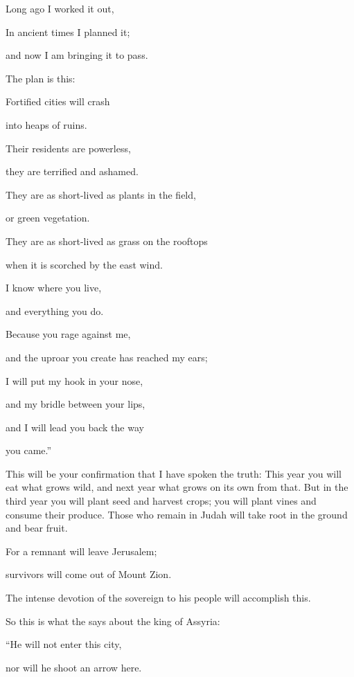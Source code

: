 {\par }{\Q Long
ago
I worked
it out,
\par }{\Q In ancient
times I planned
it;
\par }{\Q and now
I am bringing
it to pass.
\par }{\Q The plan is this:
\par }{\Q Fortified
cities
will crash
\par }{\Q into heaps
of ruins.
\par }{\Q {}Their residents
are powerless,
\par }{\Q they are terrified
and ashamed.
\par }{\Q They are as short-lived as plants
in the field,
\par }{\Q or green
vegetation.
\par }{\Q They are as short-lived as grass
on the rooftops
\par }{\Q when it is scorched
by
the east wind.
\par }{\Q {}I know
where you live,
\par }{\Q and everything you do.
\par }{\Q {}Because
you rage
against me,
\par }{\Q and the uproar
you create
has reached my ears;
\par }{\Q I
will put
my hook
in your nose,
\par }{\Q and my bridle
between your lips,
\par }{\Q and I will lead you back
the way
\par }{\Q you came.”
\par }{\PP This
will be your confirmation
that I have spoken the truth: This year
you will eat
what grows wild,
and next
year
what grows on its own
from that. But in the third
year
you will plant seed
and harvest
crops; you will plant
vines
and consume
their produce.
Those who remain
in Judah
will take root
in the ground
and bear
fruit.
\par }{\Q {}For
a remnant
will leave Jerusalem;
\par }{\Q survivors will
come out
of Mount
Zion.
\par }{\Q The intense
devotion of the sovereign
{}
to his people will accomplish
this.
\par }{\Q {}So
this is what
the {}
says about the king
of Assyria:
\par }{\Q “He will not
enter
this
city,
\par }{\Q nor
will he shoot
an
arrow
here.

}
